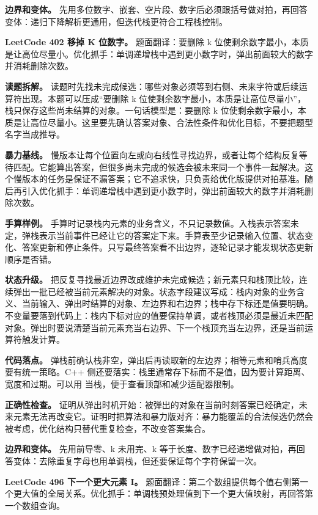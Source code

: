 \textbf{边界和变体。} 先用多位数字、嵌套、空片段、数字后必须跟括号做对拍，再回答变体：递归下降解析更通用，但迭代栈更符合工程栈控制。

\noindent\textbf{LeetCode 402 移掉 K 位数字。} 题面翻译：要删除 k 位使剩余数字最小，本质是让高位尽量小。优化抓手：单调递增栈中遇到更小数字时，弹出前面较大的数字并消耗删除次数。

\textbf{读题拆解。} 读题时先找未完成候选：哪些对象必须等到右侧、未来字符或后续运算符出现。本题可以压成“要删除 k 位使剩余数字最小，本质是让高位尽量小”，栈只保存这些尚未结算的对象。一句话模型是：要删除 k 位使剩余数字最小，本质是让高位尽量小。这里要先确认答案对象、合法性条件和优化目标，不要把题型名字当成推导。

\textbf{暴力基线。} 慢版本让每个位置向左或向右线性寻找边界，或者让每个结构反复等待匹配。它能算出答案，但很多尚未完成的候选会被未来同一个事件一起解决。这个慢版本的任务是保证不漏答案；它不追求快，只负责给优化版提供对拍基准。随后再引入优化抓手：单调递增栈中遇到更小数字时，弹出前面较大的数字并消耗删除次数。

\textbf{手算样例。} 手算时记录栈内元素的业务含义，不只记录数值。入栈表示答案未定，弹栈表示当前事件已经让它的答案定下来。手算表至少记录输入位置、状态变化、答案更新和停止条件。只写最终答案看不出边界，逐轮记录才能发现状态更新顺序是否错。

\textbf{状态升级。} 把反复寻找最近边界改成维护未完成候选；新元素只和栈顶比较，连续弹出一批已经被当前元素解决的对象。状态字段建议写成：栈内对象的业务含义、当前输入、弹出时结算的对象、左边界和右边界；栈中存下标还是值要明确。不变量要落到代码上：栈内下标对应的值要保持单调，或者栈顶必须是最近未匹配对象。弹出时要说清楚当前元素充当右边界、下一个栈顶充当左边界，还是当前运算符触发计算。

\textbf{代码落点。} 弹栈前确认栈非空，弹出后再读取新的左边界；相等元素和哨兵高度要有统一策略。C++ 侧还要落实：栈里通常存下标而不是值，因为要计算距离、宽度和过期。可以用  当栈，便于查看顶部和减少适配器限制。

\textbf{正确性检查。} 证明从弹出时机开始：被弹出的对象在当前时刻答案已经确定，未来元素无法再改变它。证明时把算法和暴力版对齐：暴力能覆盖的合法候选仍然会被考虑，优化结构只替代重复检查，不改变答案集合。

\textbf{边界和变体。} 先用前导零、k 未用完、k 等于长度、数字已经递增做对拍，再回答变体：去除重复字母也用单调栈，但还要保证每个字符保留一次。

\noindent\textbf{LeetCode 496 下一个更大元素 I。} 题面翻译：第二个数组提供每个值右侧第一个更大值的全局关系。优化抓手：单调栈预处理值到下一个更大值映射，再回答第一个数组查询。

